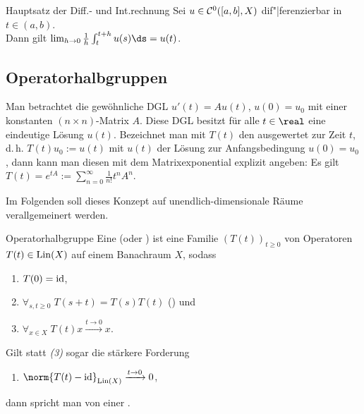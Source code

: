 \begin{Satz}{Hauptsatz der Diff.- und Int.rechnung}
    Sei $u \in \mathcal{C}^0([a, b], X)$ dif"|ferenzierbar in $t \in (a, b)$.\\
    Dann gilt $\lim_{h \to 0} \frac{1}{h} \int_t^{t+h} u(s)\ds = u(t)$.
\end{Satz}

\subsection{%
    Operatorhalbgruppen%
}

\begin{Bem}
    Man betrachtet die gewöhnliche DGL $u'(t) = Au(t)$, $u(0) = u_0$
    mit einer konstanten $(n \times n)$-Matrix $A$.
    Diese DGL besitzt für alle $t \in \real$ eine eindeutige Lösung $u(t)$.
    Bezeichnet man mit $T(t)$ den  ausgewertet zur Zeit $t$,
    d.\,h. $T(t)u_0 := u(t)$ mit $u(t)$ der Lösung zur Anfangsbedingung $u(0) = u_0$,
    dann kann man diesen mit dem Matrixexponential explizit angeben:
    Es gilt $T(t) = e^{tA} := \sum_{n=0}^\infty \frac{1}{n!} t^n A^n$.
    
    Im Folgenden soll dieses Konzept auf unendlich-dimensionale Räume verallgemeinert werden.
\end{Bem}

\linie

\begin{Def}{Operatorhalbgruppe}
    Eine  (oder ) ist eine
    Familie $(T(t))_{t \ge 0}$ von Operatoren $T(t) \in \operatorname{Lin}(X)$ auf einem Banachraum $X$, sodass
    \begin{enumerate}
        \item
        $T(0) = \text{id}$,
        
        \item
        $\forall_{s, t \ge 0}\; T(s+t) = T(s) T(t)$
        () und
        
        \item
        $\forall_{x \in X}\; T(t) x \xrightarrow{t \to 0} x$.
    \end{enumerate}
    Gilt statt \emph{(3)} sogar die stärkere Forderung
    \begin{enumerate}[label=\emph{(\arabic*')},start=3]
        \item
        $\norm{T(t) - \id}_{\Lin(X)} \xrightarrow{t \to 0} 0$,
    \end{enumerate}
    dann spricht man von einer .
\end{Def}

